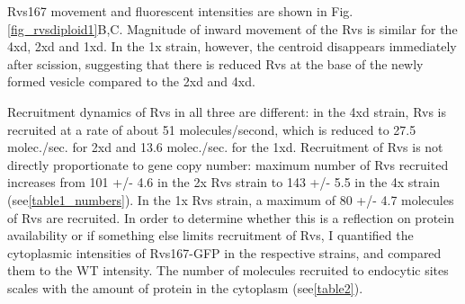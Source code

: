 \newpage
Rvs167 movement and fluorescent intensities are shown in Fig.\ref{fig_rvsdiploid1}B,C. 
Magnitude of inward movement of the Rvs is similar for the 4xd, 2xd and 1xd. In the 1x strain, however, the centroid disappears immediately after scission, suggesting that there is reduced Rvs at the base of the newly formed vesicle compared to the 2xd and 4xd.

	\vspace{5mm}
Recruitment dynamics of Rvs in all three are different: in the 4xd strain, Rvs is recruited at a rate of about 51 molecules/second, which is reduced to 27.5 molec./sec. for 2xd and 13.6 molec./sec. for the 1xd. Recruitment of Rvs is not directly proportionate to gene copy number: maximum number of Rvs recruited increases from 101 +/- 4.6 in the 2x Rvs strain to 143 +/- 5.5 in the 4x strain (see\ref{table1_numbers}). In the 1x Rvs strain, a maximum of 80 +/- 4.7 molecules of Rvs are recruited. In order to determine whether this is a reflection on protein availability or if something else limits recruitment of Rvs, I quantified the cytoplasmic intensities of Rvs167-GFP in the respective strains, and compared them to the WT intensity. The number of molecules recruited to endocytic sites scales with the amount of protein in the cytoplasm (see\ref{table2}).  



